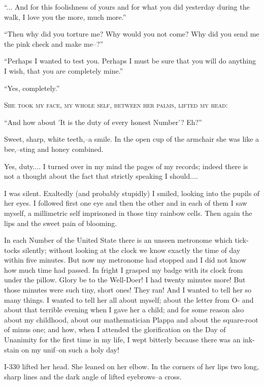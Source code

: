 \documentclass[11pt,openany]{book}
\begin{document}
``... And for this foolishness of yours and for what you did yesterday during the walk, I love you the more, much more.''

``Then why did you torture me? Why would you not come? Why did you send me the pink check and make me--?''

``Perhaps I wanted to test you. Perhaps I must be sure that you will do anything I wish, that you are completely mine.''

``Yes, completely.''

\begin{center}\textsc{She took my face, my whole self, between her palms, lifted my head:}\end{center}

``And how about 'It is the duty of every honest Number'? Eh?''

Sweet, sharp, white teeth,--a smile. In the open cup of the armchair she was like a bee,--sting and honey combined.

Yes, duty.... I turned over in my mind the pages of my records; indeed there is not a thought about the fact that strictly speaking I should....

I was silent. Exaltedly (and probably stupidly) I smiled, looking into the pupils of her eyes. I followed first one eye and then the other and in each of them I saw myself, a millimetric self imprisoned in those tiny rainbow cells. Then again the lips and the sweet pain of blooming.

In each Number of the United State there is an unseen metronome which tick-tocks silently; without looking at the clock we know exactly the time of day within five minutes. But now my metronome had stopped and I did not know how much time had passed. In fright I grasped my badge with its clock from under the pillow. Glory be to the Well-Doer! I had twenty minutes more! But those minutes were such tiny, short ones! They ran! And I wanted to tell her so many things. I wanted to tell her all about myself; about the letter from O- and about that terrible evening when I gave her a child; and for some reason also about my childhood, about our mathematician Plappa and about the square-root of minus one; and how, when I attended the glorification on the Day of Unanimity for the first time in my life, I wept bitterly because there was an ink-stain on my unif--on such a holy day!

I-330 lifted her head. She leaned on her elbow. In the corners of her lips two long, sharp lines and the dark angle of lifted eyebrows--a cross.
\end{document}

